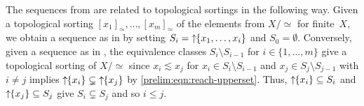 The sequences from 
are related to topological sortings in the following way.
Given a topological sorting $[x_1]_{\simeq}, \ldots, [x_m]_{\simeq}$ of the elements from $X / {\simeq}$ for finite~$X$,
we obtain a sequence as in 
by setting $S_i = \mbox{\ensuremath{\displaystyle \uparrow \!\!\{x_1, \ldots, x_i\}}}$ and $S_0 = \emptyset$.
Conversely, given a sequence as in ,
the equivalence classes $S_i \setminus S_{i-1}$ for $i \in \{1,\ldots,m\}$
give a topological sorting of $X / {\simeq}$
since $x_i \lesssim x_j$ for $x_i \in S_i \setminus S_{i-1}$ and $x_j \in S_j \setminus S_{j-1}$ with $i \ne j$
implies $\mbox{\ensuremath{\displaystyle \uparrow \!\!\{x_i\}}} \subsetneq \mbox{\ensuremath{\displaystyle \uparrow \!\!\{x_j\}}}$ by \cref{prelim:eqn:reach-upperset}.
Thus, $\mbox{\ensuremath{\displaystyle \uparrow \!\!\{x_i\}}} \subseteq S_i$
and $\mbox{\ensuremath{\displaystyle \uparrow \!\!\{x_j\}}}\subseteq S_j$
give $S_i \subsetneq S_j$ and so $i \le j$.